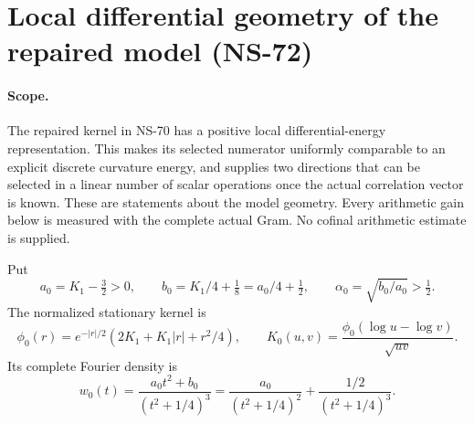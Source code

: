 \section{Local differential geometry of the repaired model (NS-72)}
\label{sec:ns72-local-geometry}

\paragraph{Scope.}
The repaired kernel in NS-70 has a positive local differential-energy
representation. This makes its selected numerator uniformly comparable
to an explicit discrete curvature energy, and supplies two directions
that can be selected in a linear number of scalar operations once the
actual correlation vector is known. These are statements about the
model geometry. Every arithmetic gain below is measured with the
complete actual Gram. No cofinal arithmetic estimate is supplied.

Put
\[
 a_0=K_1-\tfrac32>0,\qquad b_0=K_1/4+\tfrac18=a_0/4+\tfrac12,
 \qquad \alpha_0=\sqrt{b_0/a_0}>\tfrac12.
\]
The normalized stationary kernel is
\[
 \phi_0(r)=e^{-|r|/2}(2K_1+K_1|r|+r^2/4),\qquad
 K_0(u,v)=\frac{\phi_0(\log u-\log v)}{\sqrt{uv}}.
\]
Its complete Fourier density is
\begin{equation}
 w_0(t)=\frac{a_0t^2+b_0}{(t^2+1/4)^3}
       =\frac{a_0}{(t^2+1/4)^2}
                       +\frac{1/2}{(t^2+1/4)^3}.
 \label{eq:ns72-positive-split}
\end{equation}

